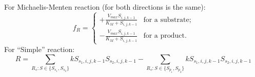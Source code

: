 \documentclass[a4paper,10pt]{article}
\begin{document}
For Michaelis-Menten reaction (for both directions is the same):
\begin{equation}
    f_R =
        \begin{cases}
            +\frac{V_{max} S_{i,j,k-1}}{K_M + S_{i,j,k-1}} &\text{for a substrate};\\
            -\frac{V_{max} S_{i,j,k-1}}{K_M + S_{i,j,k-1}} &\text{for a product}.
        \end{cases}
\end{equation}
For ``Simple'' reaction:
\begin{equation}
    R =
         \sum_{R_s : S \in \{S_{s_1}, S_{s_2}\}} k S_{s_1,i,j,k-1} S_{s_2,i,j,k-1}
        -\sum_{R_s : S \in \{S_{p_1}, S_{p_2}\}} k S_{s_1,i,j,k-1} S_{s_2,i,j,k-1}
\end{equation}







\end{document}
